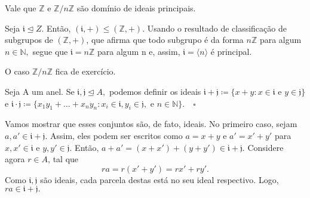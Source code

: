 \documentclass[algebraII_notes.tex]{subfiles}
\begin{document}
\begin{lemma*}
	Vale que \(\mathbb{Z}\) e \(\mathbb{Z}/n \mathbb{Z}\) são domínio de ideais principais.
\end{lemma*}
\begin{proof*}
	Seja \(\mathfrak{i} \trianglelefteq{Z}.\) Então, \((\mathfrak{i}, +)\leq (\mathbb{Z}, +)\). Usando o resultado
	de classificação de subgrupos de \((\mathbb{Z}, +)\), que afirma que todo subgrupo é da forma \(n \mathbb{Z}\) para
	algum \(n\in \mathbb{N},\) segue que \(\mathfrak{i} = n \mathbb{Z}\) para algum n e, assim, \(\mathfrak{i} = \langle n \rangle\)
	é principal.

	O caso \(\mathbb{Z}/n \mathbb{Z}\) fica de exercício. \qedsymbol
\end{proof*}
\begin{def*}
	Seja A um anel. Se \(\mathfrak{i}, \mathfrak{j} \trianglelefteq{A},\) podemos definir os ideais \(\mathfrak{i} + \mathfrak{j}\coloneqq \{x+y:x\in \mathfrak{i}\text{ e } y\in \mathfrak{j}\}\)
	e \(\mathfrak{i} \cdot \mathfrak{j}\coloneqq \{x_{1}y_{1}+\dotsc+x_{n}y_{n}: x_{i}\in \mathfrak{i}, y_{i}\in \mathfrak{j}, \text{ e } n\in \mathbb{N}\}.\quad\square\)
\end{def*}
Vamos mostrar que esses conjuntos são, de fato, ideais. No primeiro caso, sejam \(a, a'\in \mathfrak{i} + \mathfrak{j}.\)
Assim, eles podem ser escritos como \(a = x + y\) e \(a'= x'+ y'\) para \(x, x'\in \mathfrak{i}\) e \(y, y'\in \mathfrak{j}.\)
Então, \(a + a' = (x + x') + (y + y')\in \mathfrak{i} + \mathfrak{j}.\) Considere agora \(r\in A\), tal que
\[
	ra = r(x'+y') = rx' + ry'.
\]
Como \(\mathfrak{i}, \mathfrak{j}\) são ideais, cada parcela destas está no seu ideal respectivo.
Logo, \(ra \in \mathfrak{i} + \mathfrak{j}.\)
\end{document}
